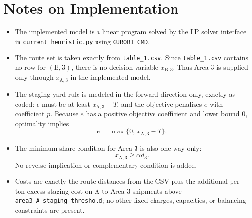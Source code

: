 \section*{Notes on Implementation}

\begin{itemize}
    \item The implemented model is a linear program solved by the LP solver interface in \texttt{current\_heuristic.py} using \texttt{GUROBI\_CMD}.
    \item The route set is taken exactly from \texttt{table\_1.csv}. Since \texttt{table\_1.csv} contains no row for $(\mathrm{B},3)$, there is no decision variable $x_{\mathrm{B},3}$. Thus Area 3 is supplied only through $x_{\mathrm{A},3}$ in the implemented model.
    \item The staging-yard rule is modeled in the forward direction only, exactly as coded: $e$ must be at least $x_{\mathrm{A},3}-T$, and the objective penalizes $e$ with coefficient $p$. Because $e$ has a positive objective coefficient and lower bound $0$, optimality implies
    \[
    e=\max\{0,\,x_{\mathrm{A},3}-T\}.
    \]
    \item The minimum-share condition for Area 3 is also one-way only:
    \[
    x_{\mathrm{A},3} \ge \alpha d_3.
    \]
    No reverse implication or complementary condition is added.
    \item Costs are exactly the route distances from the CSV plus the additional per-ton excess staging cost on A-to-Area-3 shipments above \texttt{area3\_A\_staging\_threshold}; no other fixed charges, capacities, or balancing constraints are present.
\end{itemize}
